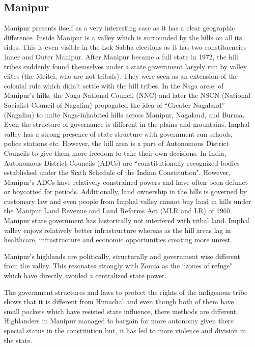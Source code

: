 \subsection{Manipur}

Manipur presents itself as a very interesting case as it has a clear geographic difference. Inside Manipur is a valley which is surrounded by the hills on all its sides. This is even visible in the Lok Sabha elections as it has two constituencies Inner and Outer Manipur. After Manipur became a full state in 1972, the hill tribes suddenly found themselves under a state government largely run by valley elites (the Meitei, who are not tribals). They were seen as an extension of the colonial rule which didn't settle with the hill tribes.  In the Naga areas of Manipur’s hills, the Naga National Council (NNC) and later the NSCN (National Socialist Council of Nagalim) propagated the idea of ``Greater Nagaland” (Nagalim) to unite Naga-inhabited hills across Manipur, Nagaland, and Burma. Even the structure of governance is different in the plains and mountains. Imphal valley has a strong presence of state structure with government run schools, police stations etc. However, the hill area is a part of Autonomous District Councils to give them more freedom to take their own decisions. In India, Autonomous District Councils (ADCs) are ``constitutionally recognized bodies established under the Sixth Schedule of the Indian Constitution". However, Manipur’s ADCs have relatively constrained powers and have often been defunct or boycotted for periods. Additionally, land ownership in the hills is governed by customary law and even people from Imphal valley cannot buy land in hills under the  Manipur Land Revenue and Land Reforms Act (MLR and LR) of 1960. Manipur state government has historically not interfered with tribal land. 
Imphal valley enjoys relatively better infrastructure whereas as the hill areas lag in healthcare, infrastructure and economic opportunities creating more unrest. \citep{lacina2009problem}

Manipur's highlands are politically, structurally and government wise different from the valley. This resonates strongly with Zomia as the ``zones of refuge" which have directly avoided a centralized state power.

The government structures and laws to protect the rights of the indigenous tribe shows that it is different from Himachal and even though both of them have small pockets which have resisted state influence, there methods are different. Highlanders in Manipur managed to bargain for more autonomy given there special status in the constitution but, it has led to more violence and division in the state.

